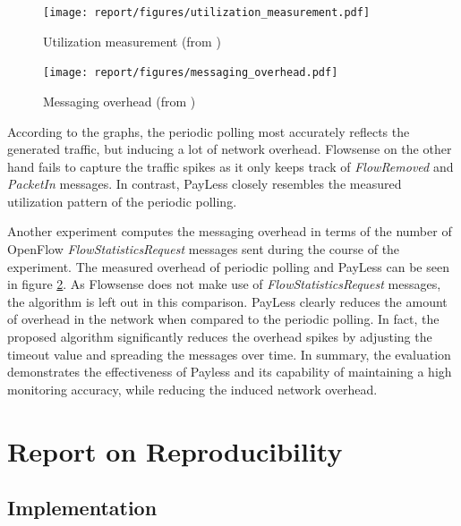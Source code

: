 \documentclass[DIV=12]{scrartcl}
\begin{document}
\begin{figure}[]
  \centering
  \texttt{[image: report/figures/utilization\_measurement.pdf]}
  \caption{Utilization measurement (from \cite{g3.chowdhury2014payless}) }
  \label{fig:util_measurement}
\end{figure}

\begin{figure}[]
  \centering
  \texttt{[image: report/figures/messaging\_overhead.pdf]}
  \caption{Messaging overhead (from \cite{g3.chowdhury2014payless}) }
  \label{fig:messaging_overhead}
\end{figure}

According to the graphs, the periodic polling most accurately reflects the generated traffic, but inducing a lot of network overhead. Flowsense \cite{g3.yu2013flowsense} on the other hand fails to capture the traffic spikes as it only keeps track of \textit{FlowRemoved} and \textit{PacketIn} messages. In contrast, PayLess closely resembles the measured utilization pattern of the periodic polling. 

Another experiment computes the messaging overhead in terms of the  number of OpenFlow \textit{FlowStatisticsRequest} messages sent during the course of the experiment. The measured overhead of periodic polling and PayLess can be seen in figure \ref{fig:messaging_overhead}. As Flowsense does not make use of \textit{FlowStatisticsRequest} messages, the algorithm is left out in this comparison. PayLess clearly reduces the amount of overhead in the network when compared to the periodic polling. In fact, the proposed algorithm significantly reduces the overhead spikes by adjusting the timeout value and spreading the messages over time. In summary, the evaluation demonstrates the effectiveness of Payless and its capability of maintaining a high monitoring accuracy, while reducing the induced network overhead. 


\section{Report on Reproducibility}

\subsection{Implementation}
\end{document}
